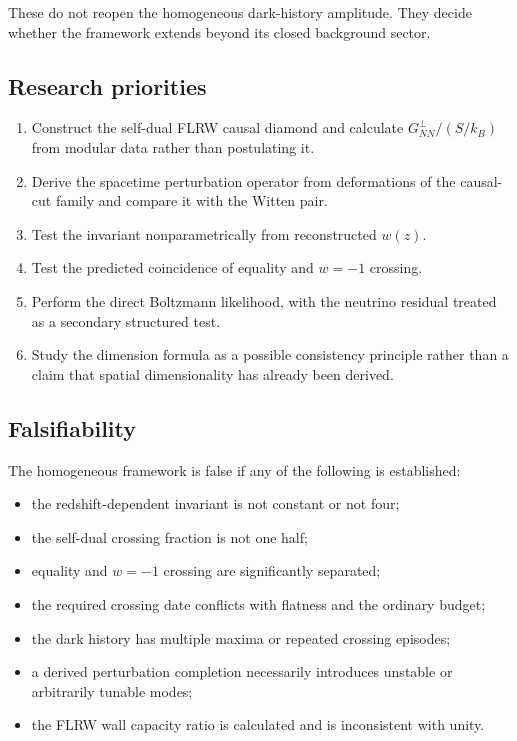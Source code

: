 \documentclass[
  11pt,
  letterpaper,
]{article}
\providecommand{\tightlist}{%
  \setlength{\itemsep}{0pt}\setlength{\parskip}{0pt}}
\begin{document}
These do not reopen the homogeneous dark-history amplitude. They decide
whether the framework extends beyond its closed background sector.

\subsection{Research priorities}\label{research-priorities}

\begin{enumerate}
\def\labelenumi{\arabic{enumi}.}
\tightlist
\item
  Construct the self-dual FLRW causal diamond and calculate
  \(G^{\perp}_{NN}/(S/k_B)\) from modular data rather than postulating
  it.
\item
  Derive the spacetime perturbation operator from deformations of the
  causal-cut family and compare it with the Witten pair.
\item
  Test the invariant nonparametrically from reconstructed \(w(z)\).
\item
  Test the predicted coincidence of equality and \(w=-1\) crossing.
\item
  Perform the direct Boltzmann likelihood, with the neutrino residual
  treated as a secondary structured test.
\item
  Study the dimension formula as a possible consistency principle rather
  than a claim that spatial dimensionality has already been derived.
\end{enumerate}

\subsection{Falsifiability}\label{falsifiability}

The homogeneous framework is false if any of the following is
established:

\begin{itemize}
\tightlist
\item
  the redshift-dependent invariant is not constant or not four;
\item
  the self-dual crossing fraction is not one half;
\item
  equality and \(w=-1\) crossing are significantly separated;
\item
  the required crossing date conflicts with flatness and the ordinary
  budget;
\item
  the dark history has multiple maxima or repeated crossing episodes;
\item
  a derived perturbation completion necessarily introduces unstable or
  arbitrarily tunable modes;
\item
  the FLRW wall capacity ratio is calculated and is inconsistent with
  unity.
\end{itemize}
\end{document}

